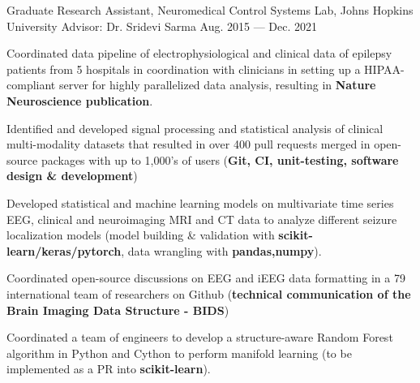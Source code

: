 \begin{cventries}
    \cvproject
        {Graduate Research Assistant, Neuromedical Control Systems Lab, Johns Hopkins University \newline Advisor: Dr. Sridevi Sarma} %
        {Aug. 2015 --- Dec. 2021} %
        {
          \begin{cvitems} %
            \item{Coordinated data pipeline of electrophysiological and clinical data of epilepsy patients from 5 hospitals in coordination with clinicians in setting up a HIPAA-compliant server for highly parallelized data analysis, resulting in \textbf{Nature Neuroscience publication}.}
            \item{Identified and developed signal processing and statistical analysis of clinical multi-modality datasets that resulted in over 400 pull requests merged in open-source packages with up to 1,000's of users (\textbf{Git, CI, unit-testing, software design \& development})}
            \item{Developed statistical and machine learning models on multivariate time series EEG, clinical and neuroimaging MRI and CT data to analyze different seizure localization models (model building \& validation with \textbf{scikit-learn/keras/pytorch}, data wrangling with \textbf{pandas,numpy}).}
            \item{Coordinated open-source discussions on EEG and iEEG data formatting in a 79 international team of researchers on Github (\textbf{technical communication of the Brain Imaging Data Structure - BIDS})}
            \item{Coordinated a team of engineers to develop a structure-aware Random Forest algorithm in Python and Cython to perform manifold learning (to be implemented as a PR into \textbf{scikit-learn}).}
          \end{cvitems}
        }
    \newline


\end{cventries}
